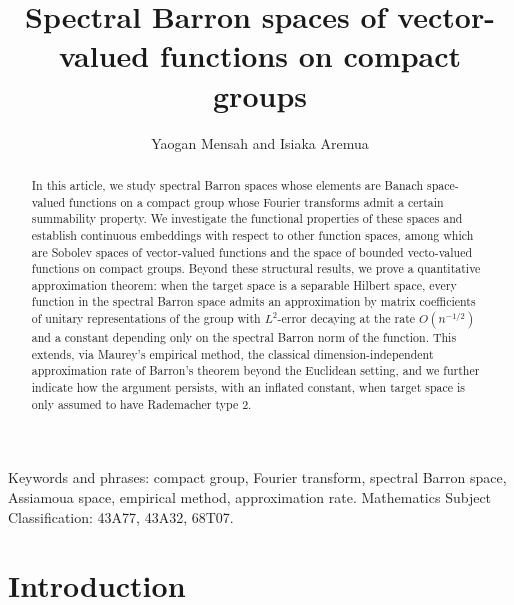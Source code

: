\documentclass[12pt]{amsart}%
\begin{document}
\title[On Spectral Barron spaces on compact groups ]{Spectral Barron spaces of vector-valued functions on compact groups}
\author{Yaogan Mensah and Isiaka Aremua}

\address{Department of Mathematics, University of Lom\'e, Togo}
\email{\textcolor[rgb]{0.00,0.00,0.84}{mensahyaogan2@gmail.com}}

\address{Department of Physics, University of Lom\'e, Togo}
\email{\textcolor[rgb]{0.00,0.00,0.84}{claudisak@gmail.com}}



\begin{abstract}
 In this article, we study spectral Barron spaces whose elements are
Banach space-valued functions on a compact group whose Fourier transforms
admit a certain summability property. We investigate the functional
properties of these spaces and establish continuous embeddings with respect
to other function spaces, among which are Sobolev spaces of vector-valued
functions and the space of bounded vecto-valued functions on compact
groups. Beyond these structural results, we prove a quantitative
approximation theorem: when the target space is a separable Hilbert space,
every function in the spectral Barron space  admits an approximation by matrix coefficients of unitary representations of the group with $L^2$-error decaying at the rate $O(n^{-1/2})$ and a constant
depending only on the spectral Barron norm of the function. This extends,
via Maurey's empirical method, the classical dimension-independent
approximation rate of Barron's theorem beyond the Euclidean setting, and we
further indicate how the argument persists, with an inflated constant, when
target space is only assumed to have Rademacher type 2.
\end{abstract}
\maketitle


Keywords and phrases: compact group, Fourier transform, spectral Barron
space, Assiamoua space, empirical method, approximation rate. 
 Mathematics Subject Classification: 43A77, 43A32, 68T07.

\section{Introduction}
\end{document}
